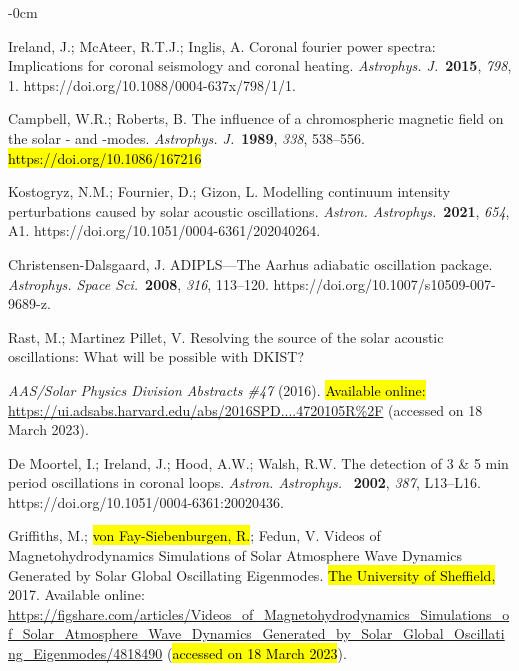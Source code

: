 \documentclass[physics,article,accept,pdftex,moreauthors]{Definitions/mdpi}
\newcommand{\aap}{{\it Astron. Astrophys.}}
\newcommand{\apj}{{\it Astrophys. J.}}
\newcommand{\apss}{{\it Astrophys. Space Sci.}}
\begin{document}
\begin{adjustwidth}{-\extralength}{0cm}
\begin{thebibliography}{999}
{		
		Ireland, J.; McAteer, R.T.J.; Inglis, A. Coronal fourier power spectra: 
Implications for coronal seismology and coronal heating. \apj~\textbf{2015}, \emph{798}, 1. https://doi.org/10.1088/0004-637x/798/1/1.
		
		
		
		Campbell, W.R.; Roberts, B. The influence of a chromospheric magnetic field on the solar 
- and -modes. \apj~\textbf{1989}, \emph{338}, 538--556. 
 \hl{https://doi.org/10.1086/167216} 
		
		 Kostogryz, N.M.; Fournier, D.; Gizon, L. Modelling continuum intensity perturbations caused by solar acoustic oscillations. \aap~\textbf{2021}, \emph{654}, A1. https://doi.org/10.1051/0004-6361/202040264.
		
		
		 Christensen-Dalsgaard, J. ADIPLS---The Aarhus adiabatic oscillation package. \apss~\textbf{2008}, \emph{316}, 113--120. https://doi.org/10.1007/s10509-007-9689-z.
		
		
		 Rast, M.; Martinez Pillet, V. {Resolving the source of the solar 
acoustic oscillations: What will be possible with DKIST?} {\emph{AAS/Solar Physics Division Abstracts \#47} (2016).
 \hl{Available online:} \url{https://ui.adsabs.harvard.edu/abs/2016SPD....4720105R%2F} (accessed on 18 March 2023). 
		
		
		 De Moortel, I.; Ireland, J.; Hood, A.W.; Walsh, R.W. The detection of 3 \& 5 min period oscillations in coronal loops. \aap~ \textbf{2002}, \emph{387}, L13--L16. https://doi.org/10.1051/0004-6361:20020436.
		
		
		
		{Griffiths}, M.; %
 \hl{von Fay-Siebenburgen, R.};  %
{Fedun}, V. {Videos of
			Magnetohydrodynamics Simulations of Solar Atmosphere Wave Dynamics Generated
			by Solar Global Oscillating Eigenmodes}. 
\hl{The University of Sheffield,}  
2017. Available online: \url{https://figshare.com/articles/Videos_of_Magnetohydrodynamics_Simulations_of_Solar_Atmosphere_Wave_Dynamics_Generated_by_Solar_Global_Oscillating_Eigenmodes/4818490} (\hl{accessed on
18 March 2023}).
		
}}
\end{thebibliography}
\end{adjustwidth}
\end{document}
